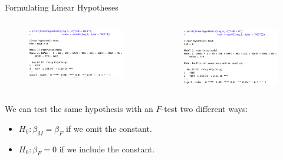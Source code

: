\begin{frame}{Formulating Linear Hypotheses}
\begin{columns}
\begin{column}{0.5\textwidth}
\begin{figure}
\flushleft
	\includegraphics [width=\textwidth]	{hypothesis_1}
\end{figure}

\end{column}
\begin{column}{0.5\textwidth}
\begin{figure}
\flushleft
	\includegraphics [width=\textwidth]	{hypothesis_2}
\end{figure}
\end{column}
\end{columns}
We can test the same hypothesis with an $F$-test two different ways:
\begin{itemize}
	\item $H_0: \beta_{M} = \beta_{F}$ if we omit the constant.
	\item $H_0: \beta_{F}=0$ if we include the constant.
\end{itemize}
\end{frame}




